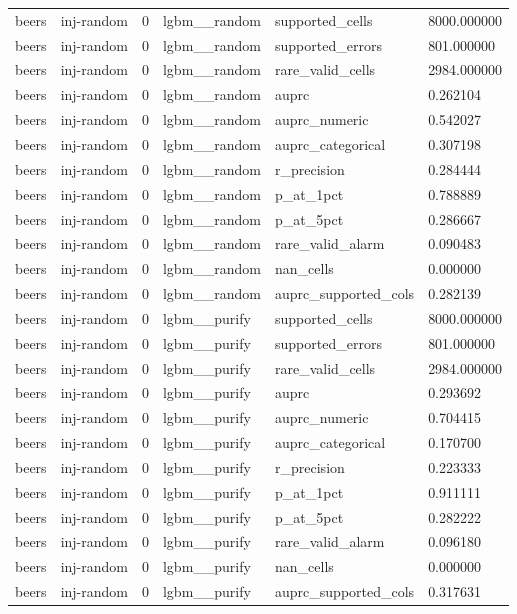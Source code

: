 \begin{tabular}{llllll}
beers & inj-random & 0 & lgbm\_\_random & supported\_cells & 8000.000000 \\
beers & inj-random & 0 & lgbm\_\_random & supported\_errors & 801.000000 \\
beers & inj-random & 0 & lgbm\_\_random & rare\_valid\_cells & 2984.000000 \\
beers & inj-random & 0 & lgbm\_\_random & auprc & 0.262104 \\
beers & inj-random & 0 & lgbm\_\_random & auprc\_numeric & 0.542027 \\
beers & inj-random & 0 & lgbm\_\_random & auprc\_categorical & 0.307198 \\
beers & inj-random & 0 & lgbm\_\_random & r\_precision & 0.284444 \\
beers & inj-random & 0 & lgbm\_\_random & p\_at\_1pct & 0.788889 \\
beers & inj-random & 0 & lgbm\_\_random & p\_at\_5pct & 0.286667 \\
beers & inj-random & 0 & lgbm\_\_random & rare\_valid\_alarm & 0.090483 \\
beers & inj-random & 0 & lgbm\_\_random & nan\_cells & 0.000000 \\
beers & inj-random & 0 & lgbm\_\_random & auprc\_supported\_cols & 0.282139 \\
beers & inj-random & 0 & lgbm\_\_purify & supported\_cells & 8000.000000 \\
beers & inj-random & 0 & lgbm\_\_purify & supported\_errors & 801.000000 \\
beers & inj-random & 0 & lgbm\_\_purify & rare\_valid\_cells & 2984.000000 \\
beers & inj-random & 0 & lgbm\_\_purify & auprc & 0.293692 \\
beers & inj-random & 0 & lgbm\_\_purify & auprc\_numeric & 0.704415 \\
beers & inj-random & 0 & lgbm\_\_purify & auprc\_categorical & 0.170700 \\
beers & inj-random & 0 & lgbm\_\_purify & r\_precision & 0.223333 \\
beers & inj-random & 0 & lgbm\_\_purify & p\_at\_1pct & 0.911111 \\
beers & inj-random & 0 & lgbm\_\_purify & p\_at\_5pct & 0.282222 \\
beers & inj-random & 0 & lgbm\_\_purify & rare\_valid\_alarm & 0.096180 \\
beers & inj-random & 0 & lgbm\_\_purify & nan\_cells & 0.000000 \\
beers & inj-random & 0 & lgbm\_\_purify & auprc\_supported\_cols & 0.317631 \\

\end{tabular}
